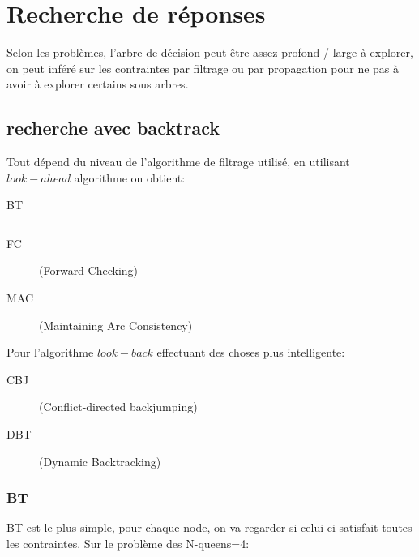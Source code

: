 \chapter{Recherche de réponses}
Selon les problèmes, l'arbre de décision peut être assez profond / large à explorer, on peut inféré sur les contraintes par filtrage ou par propagation pour ne pas à avoir à explorer certains sous arbres.
\pagebreak

\section{recherche avec backtrack}
Tout dépend du niveau de l'algorithme de filtrage utilisé, en utilisant $look-ahead$ algorithme on obtient:
\begin{description}
\item[BT] $ $
\item[FC] (Forward Checking)
\item[MAC] (Maintaining Arc Consistency)
\end{description}

Pour l'algorithme $look-back$ effectuant des choses plus intelligente:
\begin{description}
\item[CBJ] (Conflict-directed backjumping)
\item[DBT] (Dynamic Backtracking)
\end{description}

\pagebreak
\subsection{BT}
BT est le plus simple, pour chaque node, on va regarder si celui ci satisfait toutes les contraintes.
Sur le problème des N-queens=4:
\begin{multicols}{3}
\end{multicols}

